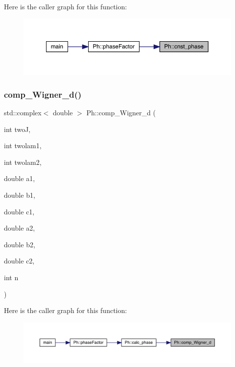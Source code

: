 Here is the caller graph for this function\+:
\nopagebreak
\begin{figure}[H]
\begin{center}
\leavevmode
\includegraphics[width=350pt]{d6/d3c/namespacePh_ac0bb2f4b2888c7c304cb6fcb1b5a7ce2_icgraph}
\end{center}
\end{figure}
\mbox{\label{namespacePh_a65b264daca1c3c0fcc6f1dc55d729cd4}} 
\subsubsection{\texorpdfstring{comp\_Wigner\_d()}{comp\_Wigner\_d()}}
{\footnotesize\ttfamily std\+::complex$<$ double $>$ Ph\+::comp\+\_\+\+Wigner\+\_\+d (\begin{DoxyParamCaption}\item[{int}]{twoJ,  }\item[{int}]{twolam1,  }\item[{int}]{twolam2,  }\item[{double}]{a1,  }\item[{double}]{b1,  }\item[{double}]{c1,  }\item[{double}]{a2,  }\item[{double}]{b2,  }\item[{double}]{c2,  }\item[{int}]{n }\end{DoxyParamCaption})}

Here is the caller graph for this function\+:
\nopagebreak
\begin{figure}[H]
\begin{center}
\leavevmode
\includegraphics[width=350pt]{d6/d3c/namespacePh_a65b264daca1c3c0fcc6f1dc55d729cd4_icgraph}
\end{center}
\end{figure}
\mbox{\label{namespacePh_ad2fd8f885053b0833441c8388a9218b8}} 
